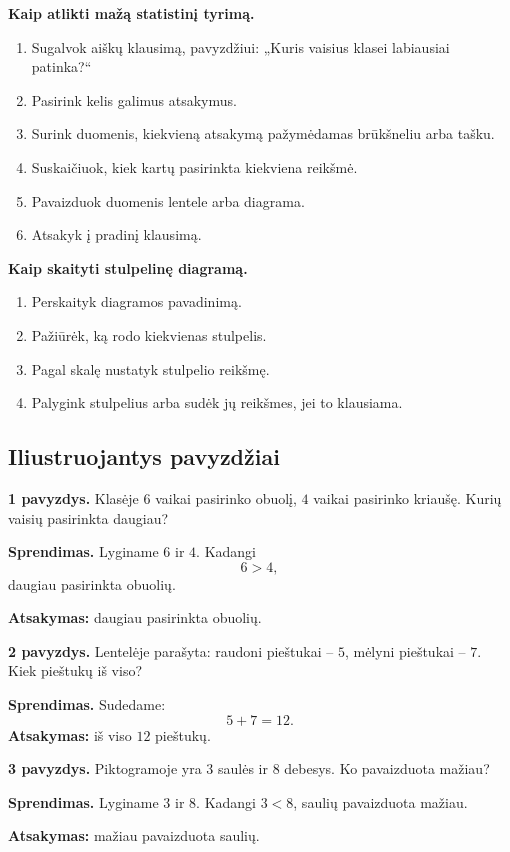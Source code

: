 \textbf{Kaip atlikti mažą statistinį tyrimą.}
\begin{enumerate}
\item Sugalvok aiškų klausimą, pavyzdžiui: „Kuris vaisius klasei labiausiai patinka?“
\item Pasirink kelis galimus atsakymus.
\item Surink duomenis, kiekvieną atsakymą pažymėdamas brūkšneliu arba tašku.
\item Suskaičiuok, kiek kartų pasirinkta kiekviena reikšmė.
\item Pavaizduok duomenis lentele arba diagrama.
\item Atsakyk į pradinį klausimą.
\end{enumerate}

\textbf{Kaip skaityti stulpelinę diagramą.}
\begin{enumerate}
\item Perskaityk diagramos pavadinimą.
\item Pažiūrėk, ką rodo kiekvienas stulpelis.
\item Pagal skalę nustatyk stulpelio reikšmę.
\item Palygink stulpelius arba sudėk jų reikšmes, jei to klausiama.
\end{enumerate}

\subsection{Iliustruojantys pavyzdžiai}

\textbf{1 pavyzdys.} Klasėje \(6\) vaikai pasirinko obuolį, \(4\) vaikai pasirinko kriaušę. Kurių vaisių pasirinkta daugiau?

\textbf{Sprendimas.} Lyginame \(6\) ir \(4\). Kadangi
\[
6>4,
\]
daugiau pasirinkta obuolių.

\textbf{Atsakymas:} daugiau pasirinkta obuolių.

\textbf{2 pavyzdys.} Lentelėje parašyta: raudoni pieštukai -- \(5\), mėlyni pieštukai -- \(7\). Kiek pieštukų iš viso?

\textbf{Sprendimas.} Sudedame:
\[
5+7=12.
\]
\textbf{Atsakymas:} iš viso \(12\) pieštukų.

\textbf{3 pavyzdys.} Piktogramoje yra \(3\) saulės ir \(8\) debesys. Ko pavaizduota mažiau?

\textbf{Sprendimas.} Lyginame \(3\) ir \(8\). Kadangi \(3<8\), saulių pavaizduota mažiau.

\textbf{Atsakymas:} mažiau pavaizduota saulių.

